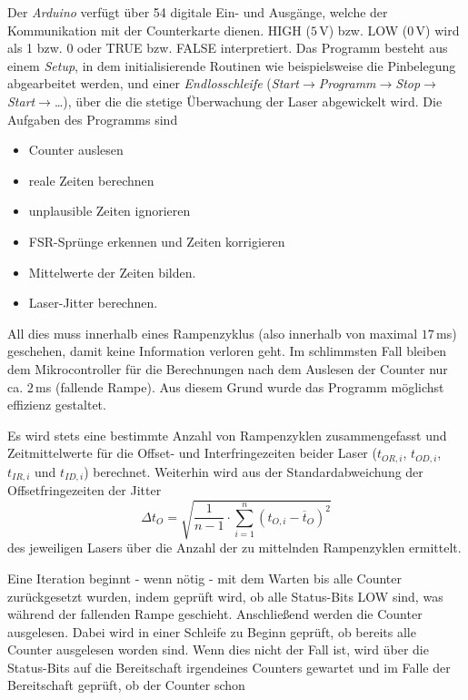 Der \textit{Arduino} verfügt über 54 digitale Ein- und Ausgänge, welche der
Kommunikation mit der Counterkarte dienen. HIGH ($5\,$V) bzw. LOW ($0\,$V) wird
als 1 bzw. 0 oder TRUE bzw. FALSE interpretiert. Das Programm besteht aus
einem
\textit{Setup}, in dem initialisierende Routinen wie beispielsweise die
Pinbelegung abgearbeitet werden, und einer \textit{Endlosschleife} (\textit{Start}$\rightarrow$\textit{Programm}$\rightarrow$\textit{Stop}$\rightarrow$\textit{Start}$\rightarrow$\ldots),
über die die stetige Überwachung der Laser abgewickelt wird. Die Aufgaben des
Programms sind
\begin{itemize}
	\item Counter auslesen
	\item reale Zeiten berechnen
	\item unplausible Zeiten ignorieren
	\item FSR-Sprünge erkennen und Zeiten korrigieren
	\item Mittelwerte der Zeiten bilden.
	\item Laser-Jitter berechnen.
\end{itemize}
All dies muss innerhalb eines Rampenzyklus (also innerhalb von maximal
$17\,$ms) geschehen, damit keine Information verloren geht. Im schlimmsten Fall
bleiben dem Mikrocontroller für die Berechnungen nach dem Auslesen der Counter
nur ca. $2\,$ms (fallende Rampe). Aus diesem Grund wurde das Programm möglichst
effizienz gestaltet.\par
Es wird stets eine bestimmte Anzahl von
Rampenzyklen zusammengefasst und Zeitmittelwerte für die Offset- und Interfringezeiten beider Laser ($t_{OR,i}$, $t_{OD,i}$, $t_{IR,i}$ und $t_{ID,i}$) berechnet. Weiterhin wird aus der
Standardabweichung der Offsetfringezeiten der Jitter
\begin{equation}\label{eq:jitter_zeit}
	\Delta
	t_O=\sqrt{\frac{1}{n-1}\cdot\sum\limits_{i=1}^{n}\left(t_{O,i}-\overline{t}_O\right)^2}
\end{equation}
des jeweiligen Lasers über die Anzahl der zu mittelnden Rampenzyklen
ermittelt.\par
Eine Iteration beginnt - wenn nötig - mit dem Warten bis alle
Counter zurückgesetzt wurden, indem geprüft wird, ob alle Status-Bits LOW sind,
was während der fallenden Rampe geschieht.
Anschließend werden die Counter ausgelesen. Dabei wird in einer Schleife zu
Beginn geprüft, ob bereits alle Counter ausgelesen worden sind. Wenn dies nicht
der Fall ist, wird über die Status-Bits auf die Bereitschaft irgendeines
Counters gewartet und im Falle der Bereitschaft geprüft, ob der Counter schon

